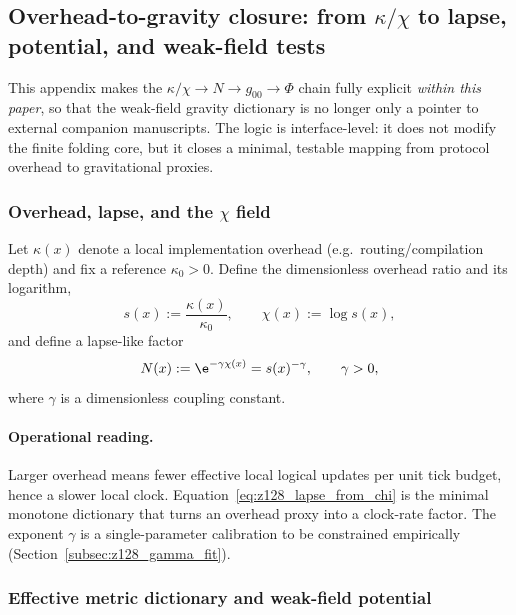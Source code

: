 \subsection{Overhead-to-gravity closure: from \texorpdfstring{$\kappa/\chi$}{kappa/chi} to lapse, potential, and weak-field tests}
\label{app:overhead_to_gravity_closure}

This appendix makes the $\kappa/\chi\rightarrow N\rightarrow g_{00}\rightarrow \Phi$ chain fully explicit \emph{within this paper},
so that the weak-field gravity dictionary is no longer only a pointer to external companion manuscripts.
The logic is interface-level: it does not modify the finite folding core, but it closes a minimal, testable mapping from protocol overhead to gravitational proxies.

\subsubsection{Overhead, lapse, and the \texorpdfstring{$\chi$}{chi} field}
\label{subsec:z128_overhead_lapse}

\begin{definition}
\label{def:z128_overhead_lapse}
Let $\kappa(x)$ denote a local implementation overhead (e.g.\ routing/compilation depth) and fix a reference $\kappa_0>0$.
Define the dimensionless overhead ratio and its logarithm,
\[
s(x):=\frac{\kappa(x)}{\kappa_0},\qquad \chi(x):=\log s(x),
\]
and define a lapse-like factor
\begin{equation}
\label{eq:z128_lapse_from_chi}
N(x):=\e^{-\gamma\chi(x)} = s(x)^{-\gamma},
\qquad \gamma>0,
\end{equation}
where $\gamma$ is a dimensionless coupling constant.
\end{definition}

\paragraph{Operational reading.}
\InterfaceTag Larger overhead means fewer effective local logical updates per unit tick budget, hence a slower local clock.
Equation~\eqref{eq:z128_lapse_from_chi} is the minimal monotone dictionary that turns an overhead proxy into a clock-rate factor.
The exponent $\gamma$ is a single-parameter calibration to be constrained empirically (Section~\ref{subsec:z128_gamma_fit}).

\subsubsection{Effective metric dictionary and weak-field potential}
\label{subsec:z128_metric_dictionary}

